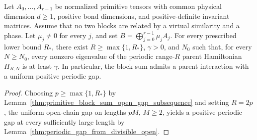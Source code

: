 \begin{lemma}
    \label{thm:primitive_block_sum_parent_gap}
    \leanok
    Let $A_0,\ldots,A_{r-1}$ be normalized primitive tensors with
    common physical dimension $d\geq1$, positive bond dimensions,
    and positive-definite invariant matrices. Assume that no two blocks
    are related by a virtual similarity and a phase. Let
    $\mu_j\ne0$ for every $j$, and set
    $B=\bigoplus_{j=0}^{r-1}\mu_jA_j$.
    For every prescribed lower bound $R_*$, there exist
    $R\geq\max\{1,R_*\}$, $\gamma>0$, and $N_0$ such that, for every
    $N\geq N_0$, every nonzero eigenvalue of the periodic range-$R$ parent
    Hamiltonian $H_{R,N}$ is at least $\gamma$.
    In particular, the block sum admits a parent interaction with a
    uniform positive periodic gap.
\end{lemma}
\begin{proof}
    \leanok
    Choosing $p\geq\max\{1,R_*\}$ by
    Lemma~\ref{thm:primitive_block_sum_open_gap_subsequence} and setting
    $R=2p$, the uniform open-chain gap on lengths $pM$, $M\geq2$, yields a
    positive periodic gap at every sufficiently large length by
    Lemma~\ref{thm:periodic_gap_from_divisible_open}.
\end{proof}


